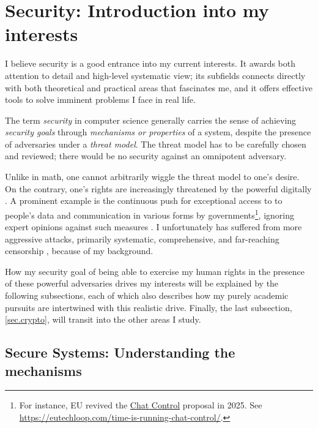\documentclass{article}
\begin{document}
\section{Security: Introduction into my interests}
I believe security is a good entrance into my current interests. It awards both
attention to detail and high-level systematic view; its subfields connects
directly with both theoretical and practical areas that fascinates me, and it
offers effective tools to solve imminent problems I face in real life. 

The term \emph{security} in computer science generally carries the sense of
achieving \emph{security goals} through \emph{mechanisms or properties} of a
system, despite the presence of adversaries under a \emph{threat model}. The
threat model has to be carefully chosen and reviewed; there would be no
security against an omnipotent adversary.

Unlike in math, one cannot arbitrarily wiggle the threat model to one's desire.
On the contrary, one's rights are increasingly threatened by the
powerful digitally \cite{eu.digital.1, eu.digital.2, internet.shutdown.2024}. A
prominent example is the continuous push for exceptional access to to people's
data and communication in various forms by governments\footnote{ For instance,
	EU revived the \href{
https://eur-lex.europa.eu/legal-content/EN/TXT/?uri=COM\%3A2022\%3A209\%3AFIN}
{Chat Control} proposal in 2025. See \url{
https://eutechloop.com/time-is-running-chat-control/}.}, ignoring expert
opinions against such measures \cite{keys.under.doormats, bugs.in.our.pockets}.
I unfortunately has suffered from more aggressive attacks, primarily
systematic, comprehensive, and far-reaching censorship \cite{internet.coup}
\cite[Sect.~5]{chall.censor.circum}, because of my background.

How my security goal of being able to exercise my human rights in the presence of
these powerful adversaries drives my interests will be explained by the
following subsections, each of which also describes how my purely academic
pursuits are intertwined with this realistic drive. Finally, the last
subsection, \ref{sec.crypto}, will transit into the other areas I study.

\subsection{Secure Systems: Understanding the mechanisms} \label{sec.secure.systems}
\end{document}
